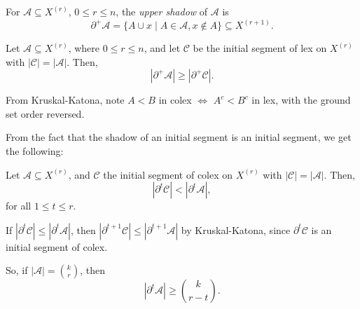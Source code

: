 \documentclass[12pt]{article}
\begin{document}
For $\mathcal{A} \subseteq X^{(r)}$, $0 \leq r \leq n$, the \emph{upper shadow} of $\mathcal{A}$ is
\[
	\partial^+ \mathcal{A} = \{A \cup x \mid A \in \mathcal{A}, x \not \in A\} \subseteq X^{(r + 1)}.
\]

\begin{corollary}
	Let $\mathcal{A} \subseteq X^{(r)}$, where $0 \leq r \leq n$, and let $\mathcal{C}$ be the initial segment of lex on $X^{(r)}$ with $|\mathcal{C}| = |\mathcal{A}|$. Then,
	\[
		|\partial^+ \mathcal{A}| \geq |\partial^+ \mathcal{C}|.
	\]
\end{corollary}

\begin{proofbox}
	From Kruskal-Katona, note $A < B$ in colex $\iff$ $A^{c} < B^{c}$ in lex, with the ground set order reversed.
\end{proofbox}

From the fact that the shadow of an initial segment is an initial segment, we get the following:

\begin{corollary}
	Let $\mathcal{A} \subseteq X^{(r)}$, and $\mathcal{C}$ the initial segment of colex on $X^{(r)}$ with $|\mathcal{C}| = |\mathcal{A}|$. Then,
	\[
		|\partial^t \mathcal{C}| < |\partial^t \mathcal{A}|,
	\]
	for all $1 \leq t \leq r$.
\end{corollary}

\begin{proofbox}
	If $|\partial^t \mathcal{C}| \leq |\partial^t \mathcal{A}|$, then $|\partial^{t+1} \mathcal{C}| \leq |\partial^{t+1} \mathcal{A}|$ by Kruskal-Katona, since $\partial^t \mathcal{C}$ is an initial segment of colex.
\end{proofbox}

So, if $|\mathcal{A}| = \binom kr$, then
\[
	|\partial^t \mathcal{A}| \geq \binom k{r-t}.
\]


\newpage

\printindex
\end{document}
